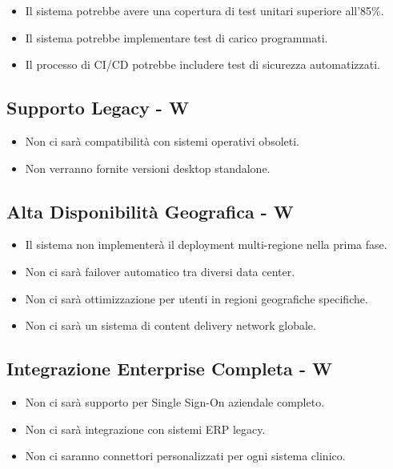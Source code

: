 \documentclass[12pt,a4paper,oneside]{report}
\begin{document}
\begin{itemize}
    \item Il sistema potrebbe avere una copertura di test unitari superiore all'85\%.
    \item Il sistema potrebbe implementare test di carico programmati.
    \item Il processo di CI/CD potrebbe includere test di sicurezza automatizzati.
\end{itemize}

\subsection{Supporto Legacy - W}

\begin{itemize}
    \item Non ci sarà compatibilità con sistemi operativi obsoleti.
    \item Non verranno fornite versioni desktop standalone.
\end{itemize}

\subsection{Alta Disponibilità Geografica - W}

\begin{itemize}
    \item Il sistema non implementerà il deployment multi-regione nella prima fase.
    \item Non ci sarà failover automatico tra diversi data center.
    \item Non ci sarà ottimizzazione per utenti in regioni geografiche specifiche.
    \item Non ci sarà un sistema di content delivery network globale.
\end{itemize}

\subsection{Integrazione Enterprise Completa - W}

\begin{itemize}
    \item Non ci sarà supporto per Single Sign-On aziendale completo.
    \item Non ci sarà integrazione con sistemi ERP legacy.
    \item Non ci saranno connettori personalizzati per ogni sistema clinico.
\end{itemize}
\end{document}
